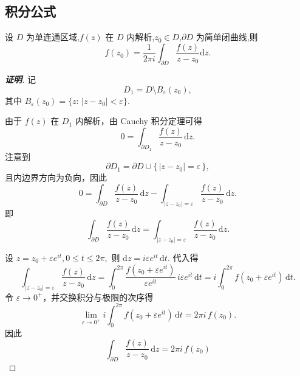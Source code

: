 \documentclass[openany,oneside]{ctexbook}
\begin{document}
\subsection{积分公式}
\begin{theorem}
  设 $D$ 为单连通区域,$f(z)$ 在 $D$ 内解析,$z_0 \in D$,$\partial D$ 为简单闭曲线,则
\[
f(z_0) = \frac{1}{2\pi i} \int_{\partial D} \frac{f(z)}{z - z_0}\mathrm{d}z.
\]
\end{theorem}
\begin{proof}[\textbf{证明}]
记
\[
D_1 = D \setminus B_\varepsilon(z_0),
\]
其中 $B_\varepsilon(z_0)=\{z:\,|z-z_0|<\varepsilon\}$.

由于 $f(z)$ 在 $D_1$ 内解析，由 Cauchy 积分定理可得
\[
0
=
\int_{\partial D_1} \frac{f(z)}{z-z_0}\,\mathrm{d}z.
\]
注意到
\[
\partial D_1 = \partial D \cup \{\,|z-z_0|=\varepsilon\,\},
\]
且内边界方向为负向，因此
\[
0
=
\int_{\partial D} \frac{f(z)}{z-z_0}\,\mathrm{d}z
-
\int_{|z-z_0|=\varepsilon} \frac{f(z)}{z-z_0}\,\mathrm{d}z.
\]
即
\[
\int_{\partial D} \frac{f(z)}{z-z_0}\,\mathrm{d}z
=
\int_{|z-z_0|=\varepsilon} \frac{f(z)}{z-z_0}\,\mathrm{d}z.
\]

设
$
z = z_0 + \varepsilon e^{it},
0 \le t \le 2\pi,
$
则
$
\mathrm{d}z = i\varepsilon e^{it}\,\mathrm{d}t.
$
代入得
\[
\int_{|z-z_0|=\varepsilon} \frac{f(z)}{z-z_0}\,\mathrm{d}z
=
\int_0^{2\pi}
\frac{f(z_0+\varepsilon e^{it})}{\varepsilon e^{it}}
\, i\varepsilon e^{it}\,\mathrm{d}t
=
i\int_0^{2\pi} f(z_0+\varepsilon e^{it})\,\mathrm{d}t.
\]
令 $\varepsilon \to 0^+$，并交换积分与极限的次序得
\[
\lim_{\varepsilon\to 0^+}
i\int_0^{2\pi} f(z_0+\varepsilon e^{it})\,\mathrm{d}t
=
2\pi i\, f(z_0).
\]
因此
\[
\boxed{
\int_{\partial D} \frac{f(z)}{z-z_0}\,\mathrm{d}z
=
2\pi i\, f(z_0)
}
\]
\end{proof}
\end{document}
